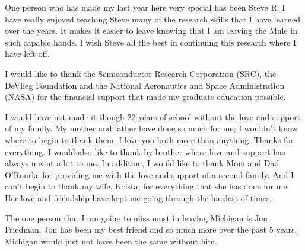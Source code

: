 One person who has made my last year here very special has been Steve R. I have really enjoyed teaching Steve many of the research skills that I have learned over the years. It makes it easier to leave knowing that I am leaving the Mule in such capable hands. I wish Steve all the best in continuing this research where I have left off.

I would like to thank the Semiconductor Research Corporation (SRC), the DeVlieg Foundation and the National Aeronautics and Space Administration (NASA) for the financial support that made my graduate education possible.

I would have not made it though 22 years of school without the love and support of my family. My mother and father have done so much for me, I wouldn’t know where to begin to thank them. I love you both more than anything. Thanks for everything. I would also like to thank by brother whose love and support has always meant a lot to me. In addition, I would like to thank Mom and Dad O’Rourke for providing me with the love and support of a second family. And I can’t begin to thank my wife, Krista, for everything that she has done for me. Her love and friendship have kept me going through the hardest of times.

The one person that I am going to miss most in leaving Michigan is Jon Friedman. Jon has been my best friend and so much more over the past 5 years. Michigan would just not have been the same without him.

\clearpage
